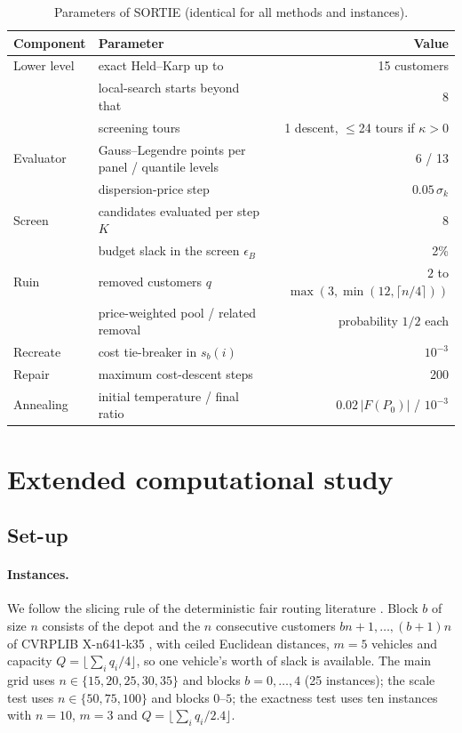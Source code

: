 \documentclass[11pt]{article}
\begin{document}
\begin{table}[t]\centering\small
\caption{Parameters of SORTIE (identical for all methods and instances).}\label{tab:params}
\begin{tabular}{llr}
\toprule
Component & Parameter & Value\\
\midrule
Lower level & exact Held--Karp up to & 15 customers\\
 & local-search starts beyond that & 8\\
 & screening tours & 1 descent, $\le$24 tours if $\kappa>0$\\
Evaluator & Gauss--Legendre points per panel / quantile levels & 6 / 13\\
 & dispersion-price step & $0.05\,\sigma_k$\\
Screen & candidates evaluated per step $K$ & 8\\
 & budget slack in the screen $\epsilon_B$ & 2\%\\
Ruin & removed customers $q$ & $2$ to $\max(3,\min(12,\lceil n/4\rceil))$\\
 & price-weighted pool / related removal & probability $1/2$ each\\
Recreate & cost tie-breaker in $s_b(i)$ & $10^{-3}$\\
Repair & maximum cost-descent steps & 200\\
Annealing & initial temperature / final ratio & $0.02\,|F(P_0)|$ / $10^{-3}$\\
\bottomrule
\end{tabular}
\end{table}


\section{Extended computational study}\label{sec:sexp}

\subsection{Set-up}
\paragraph{Instances.} We follow the slicing rule of the deterministic fair
routing literature \citep{ljubic2026fair}. Block $b$ of size $n$ consists of the
depot and the $n$ consecutive customers $bn+1,\dots,(b+1)n$ of CVRPLIB
X-n641-k35 \citep{uchoa2017new}, with ceiled Euclidean distances, $m=5$
vehicles and capacity $Q=\lfloor\sum_i q_i/4\rfloor$, so one vehicle's worth
of slack is available. The main grid uses $n\in\{15,20,25,30,35\}$ and blocks
$b=0,\dots,4$ (25 instances); the scale test uses $n\in\{50,75,100\}$ and
blocks $0$--$5$; the exactness test uses ten instances with $n=10$, $m=3$ and
$Q=\lfloor\sum_i q_i/2.4\rfloor$.
\end{document}
